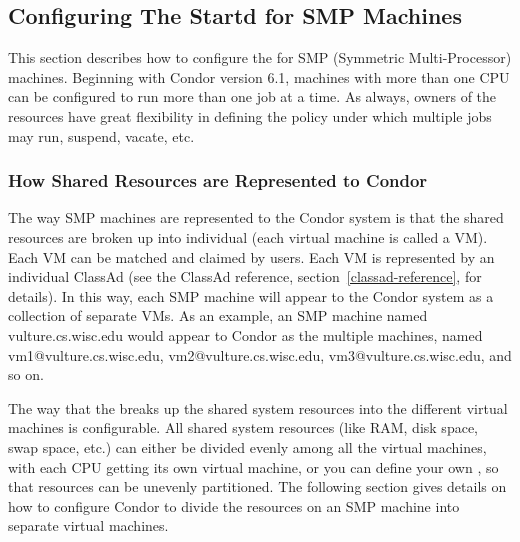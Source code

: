 \subsection{\label{sec:Configuring-SMP}
Configuring The Startd for SMP Machines}

This section describes how to configure the  for SMP
(Symmetric Multi-Processor) machines.
Beginning with Condor version 6.1, machines with more than one CPU can
be configured to run more than one job at a time.
As always, owners of the resources have great flexibility in defining
the policy under which multiple jobs may run, suspend, vacate, etc.  

\subsubsection{\label{sec:How-Resources-Represented}
How Shared Resources are Represented to Condor}

The way SMP machines are represented to the Condor system is that
the shared resources are broken up into individual  (each virtual machine is called a VM).
Each VM can be matched and claimed by users.
Each VM is represented by an individual ClassAd
(see the ClassAd reference, section~\ref{classad-reference}, for
details). 
In this way, each SMP machine will appear to the Condor system as
a collection of separate VMs.  
As an example, an SMP machine named
vulture.cs.wisc.edu would appear to Condor as the
multiple machines, named vm1@vulture.cs.wisc.edu,
vm2@vulture.cs.wisc.edu,
vm3@vulture.cs.wisc.edu, and so on.

The way that the  breaks up the
shared system resources into the different virtual machines  
is configurable.
All shared system resources (like RAM, disk space, swap space, etc.)
can either be divided evenly among all the virtual machines, with each
CPU getting its own virtual machine, or you can define your own
, so that resources can be unevenly
partitioned.
The following section gives details on how to configure Condor to
divide the resources on an SMP machine into separate virtual machines.

